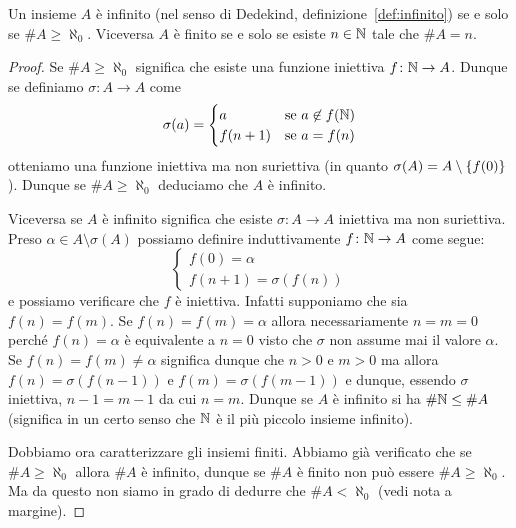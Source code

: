\begin{theorem}
Un insieme $A$ è infinito (nel senso di Dedekind, definizione~\ref{def:infinito})
se e solo se $\# A \ge \aleph_0$.
Viceversa $A$ è finito se e solo se esiste $n\in{\mathbb N}$ tale che $\# A = n$.
\end{theorem}
%
\begin{proof}
Se $\#A \ge \aleph_0$ significa che esiste una funzione 
iniettiva $f\colon {\mathbb N}\to A$. 
Dunque se definiamo $\sigma \colon A \to A$ come
\[
\sigma(a) = \begin{cases}
  a & \text{se $a\not\in f({\mathbb N})$}\\
  f(n+1) & \text{se $a=f(n)$}
\end{cases}
\]
otteniamo una funzione iniettiva ma non suriettiva 
(in quanto $\sigma(A) = A\setminus{\left\{ f(0) \right\}}$).
Dunque se $\#A\ge \aleph_0$ deduciamo che $A$ è infinito.

Viceversa se $A$ è infinito significa che esiste $\sigma\colon A \to A$ 
iniettiva ma non suriettiva. 
Preso $\alpha \in A \setminus\sigma(A)$
possiamo definire induttivamente $f\colon {\mathbb N}\to A$ come segue:
\[
\begin{cases}
  f(0) = \alpha\\
  f(n+1) = \sigma(f(n))
\end{cases}
\]
e possiamo verificare che $f$ è iniettiva. 
Infatti supponiamo che sia $f(n)=f(m)$.
Se $f(n)=f(m)=\alpha$ allora necessariamente $n=m=0$ 
perché $f(n)=\alpha$ è equivalente a $n=0$ visto che $\sigma$
non assume mai il valore $\alpha$.
Se $f(n)=f(m)\neq \alpha$ significa dunque che $n>0$ e $m>0$
ma allora $f(n)=\sigma(f(n-1))$ e $f(m)=\sigma(f(m-1))$
e dunque, essendo $\sigma$ iniettiva, $n-1=m-1$ da cui $n=m$. 
Dunque se $A$ è infinito si ha $\#{\mathbb N}\le \#A$
(significa in un certo senso che ${\mathbb N}$ è il più piccolo insieme infinito).

Dobbiamo ora caratterizzare gli insiemi finiti.
Abbiamo già verificato che se $\#A \ge \aleph_0$ 
allora $\#A$ è infinito, dunque se $\#A$ è finito 
non può essere $\#A \ge \aleph_0$.
Ma da questo non siamo in grado di dedurre che $\#A < \aleph_0$ (vedi nota a margine).%
%


\end{proof}
